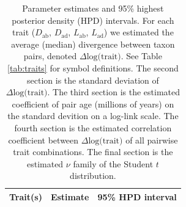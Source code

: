 \documentclass[
  10pt,
]{article}
\begin{document}
\begin{table}[ht]
\caption{\label{tab:modeloutput} Parameter estimates and 95\% highest posterior density (HPD) intervals. For each trait ($D_\mathrm{ab}$, $D_\mathrm{ad}$, $L_\mathrm{ab}$, $L_\mathrm{ad}$) we estimated the average (median) divergence between taxon pairs, denoted $\Delta \text{log(trait)}$. See Table \ref{tab:traits} for symbol definitions. The second section is the standard deviation of $\Delta \text{log(trait)}$. The third section is the estimated coefficient of pair age (millions of years) on the standard devition on a log-link scale. The fourth section is the estimated correlation coefficient between $\Delta \text{log(trait)}$ of all pairwise trait combinations. The final section is the estimated $\nu$ family of the Student $t$ distribution.}
\begin{center}
\begin{tabular}{lll}

  \toprule
  Trait(s) & Estimate & 95\% HPD interval \\
  \midrule
  

\end{tabular}
\end{center}
\end{table}
\end{document}
